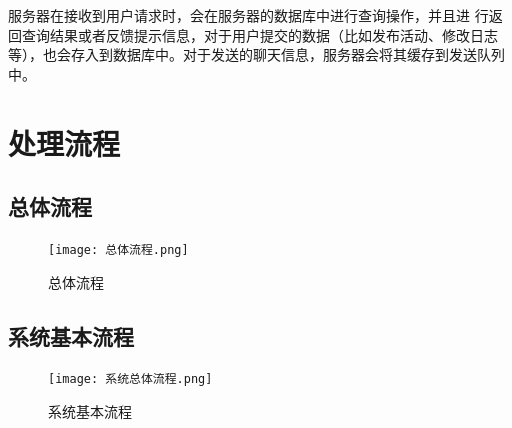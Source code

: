 服务器在接收到用户请求时，会在服务器的数据库中进行查询操作，并且进
行返回查询结果或者反馈提示信息，对于用户提交的数据（比如发布活动、修改日志等），也会存入到数据库中。对于发送的聊天信息，服务器会将其缓存到发送队列中。

\section{处理流程}
    \subsection{总体流程}
        \begin{figure}[ht]
            \centering
            \texttt{[image: 总体流程.png]}\label{tab:classification}
            \caption{总体流程}\label{fig:noted-figure}
        \end{figure}
        \newpage
    \subsection{系统基本流程}
        \begin{figure}[ht]
            \centering
            \texttt{[image: 系统总体流程.png]}\label{tab:classification}
            \caption{系统基本流程}\label{fig:noted-figure}
        \end{figure}
        \newpage

